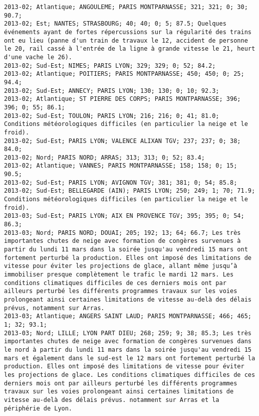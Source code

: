 \documentclass{article}
\begin{document}
\begin{Verbatim}[commandchars=\\\{\}]
2013-02; Atlantique; ANGOULEME; PARIS MONTPARNASSE; 321; 321; 0; 30; 90.7; 
2013-02; Est; NANTES; STRASBOURG; 40; 40; 0; 5; 87.5; Quelques événements ayant de fortes répercussions sur la régularité des trains ont eu lieu (panne d'un train de travaux le 12, accident de personne le 20, rail cassé à l'entrée de la ligne à grande vitesse le 21, heurt d'une vache le 26).
2013-02; Sud-Est; NIMES; PARIS LYON; 329; 329; 0; 52; 84.2; 
2013-02; Atlantique; POITIERS; PARIS MONTPARNASSE; 450; 450; 0; 25; 94.4; 
2013-02; Sud-Est; ANNECY; PARIS LYON; 130; 130; 0; 10; 92.3; 
2013-02; Atlantique; ST PIERRE DES CORPS; PARIS MONTPARNASSE; 396; 396; 0; 55; 86.1; 
2013-02; Sud-Est; TOULON; PARIS LYON; 216; 216; 0; 41; 81.0; Conditions météorologiques difficiles (en particulier la neige et le froid).
2013-02; Sud-Est; PARIS LYON; VALENCE ALIXAN TGV; 237; 237; 0; 38; 84.0; 
2013-02; Nord; PARIS NORD; ARRAS; 313; 313; 0; 52; 83.4; 
2013-02; Atlantique; VANNES; PARIS MONTPARNASSE; 158; 158; 0; 15; 90.5; 
2013-02; Sud-Est; PARIS LYON; AVIGNON TGV; 381; 381; 0; 54; 85.8; 
2013-02; Sud-Est; BELLEGARDE (AIN); PARIS LYON; 250; 249; 1; 70; 71.9; Conditions météorologiques difficiles (en particulier la neige et le froid).
2013-03; Sud-Est; PARIS LYON; AIX EN PROVENCE TGV; 395; 395; 0; 54; 86.3; 
2013-03; Nord; PARIS NORD; DOUAI; 205; 192; 13; 64; 66.7; Les très importantes chutes de neige avec formation de congères survenues à partir du lundi 11 mars dans la soirée jusqu'au vendredi 15 mars ont fortement perturbé la production. Elles ont imposé des limitations de vitesse pour éviter les projections de glace, allant même jusqu’à immobiliser presque complètement le trafic le mardi 12 mars. Les conditions climatiques difficiles de ces derniers mois ont par ailleurs perturbé les différents programmes travaux sur les voies prolongeant ainsi certaines limitations de vitesse au-delà des délais prévus, notamment sur Arras.
2013-03; Atlantique; ANGERS SAINT LAUD; PARIS MONTPARNASSE; 466; 465; 1; 32; 93.1; 
2013-03; Nord; LILLE; LYON PART DIEU; 268; 259; 9; 38; 85.3; Les très importantes chutes de neige avec formation de congères survenues dans le nord à partir du lundi 11 mars dans la soirée jusqu'au vendredi 15 mars et également dans le sud-est le 12 mars ont fortement perturbé la production. Elles ont imposé des limitations de vitesse pour éviter les projections de glace. Les conditions climatiques difficiles de ces derniers mois ont par ailleurs perturbé les différents programmes travaux sur les voies prolongeant ainsi certaines limitations de vitesse au-delà des délais prévus. notamment sur Arras et la périphérie de Lyon.

\end{Verbatim}
\end{document}
